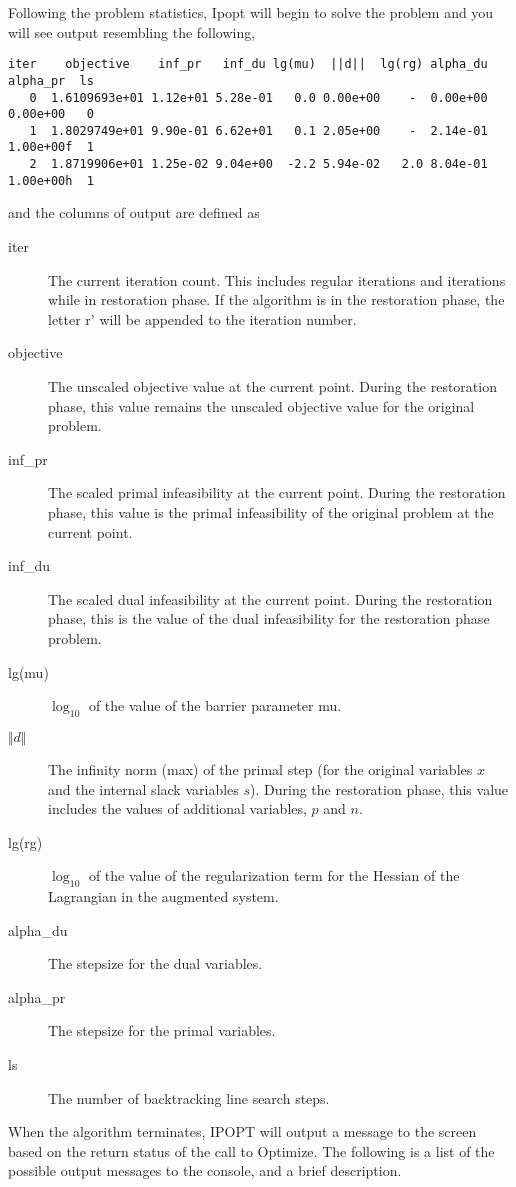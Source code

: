 Following the problem statistics, Ipopt will begin to solve the problem and you will see output resembling the following,
\begin{verbatim}
iter    objective    inf_pr   inf_du lg(mu)  ||d||  lg(rg) alpha_du alpha_pr  ls
   0  1.6109693e+01 1.12e+01 5.28e-01   0.0 0.00e+00    -  0.00e+00 0.00e+00   0
   1  1.8029749e+01 9.90e-01 6.62e+01   0.1 2.05e+00    -  2.14e-01 1.00e+00f  1
   2  1.8719906e+01 1.25e-02 9.04e+00  -2.2 5.94e-02   2.0 8.04e-01 1.00e+00h  1
\end{verbatim}
and the columns of output are defined as
\begin{description}
\item[iter]
The current iteration count.
This includes regular iterations and iterations while in restoration phase.
If the algorithm is in the restoration phase, the letter r' will be appended to the iteration number.
\item[objective]
The unscaled objective value at the current point.
During the restoration phase, this value remains the unscaled objective value for the original problem.
\item[inf\_pr]
The scaled primal infeasibility at the current point.
During the restoration phase, this value is the primal infeasibility of the original problem at the current point.
\item[inf\_du]
The scaled dual infeasibility at the current point.
During the restoration phase, this is the value of the dual infeasibility for the restoration phase problem.
\item[lg(mu)]
$\log_{10}$ of the value of the barrier parameter mu.
\item[$\Vert d\Vert$]
The infinity norm (max) of the primal step (for the original variables $x$ and the internal slack variables $s$).
During the restoration phase, this value includes the values of additional variables, $p$ and $n$.
\item[lg(rg)]
$\log_{10}$ of the value of the regularization term for the Hessian of the Lagrangian in the augmented system.
\item[alpha\_du]
The stepsize for the dual variables.
\item[alpha\_pr]
The stepsize for the primal variables.
\item[ls]
The number of backtracking line search steps.
\end{description}

When the algorithm terminates, IPOPT will output a message to the screen based on the return status of the call to Optimize.
The following is a list of the possible output messages to the console, and a brief description.

